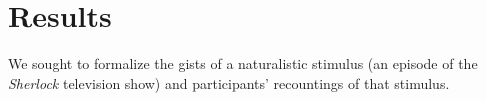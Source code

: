 \documentclass{article}
\begin{document}
\section*{Results}



We sought to formalize the gists of a naturalistic stimulus (an episode of the \textit{Sherlock} television show) and participants' recountings of that stimulus.
\end{document}

